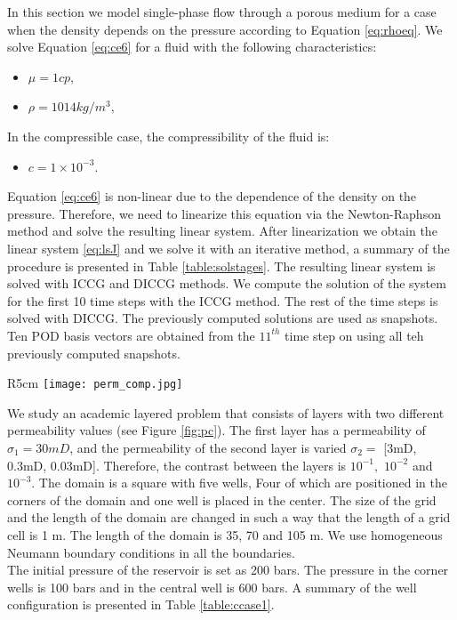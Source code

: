 \documentclass[12pt]{article}
\numberwithin{equation}{section}
\begin{document}
In this section we model single-phase flow through a porous medium for a case when the density depends on the pressure according to Equation \ref{eq:rhoeq}. We solve Equation \eqref{eq:ce6} for a fluid with the following characteristics:
\begin{itemize}
 \item $\mu = 1 cp$,
 \item $\rho = 1014 kg/m^3$,
\end{itemize}
In the compressible case, the compressibility of the fluid is:
\begin{itemize}
 \item $c= 1 \times 10^{-3}$.
\end{itemize}
Equation \eqref{eq:ce6} is non-linear due to the dependence of the density on the pressure. Therefore, we need to linearize this equation via the Newton-Raphson method and solve the resulting linear system. After linearization we obtain the linear system \eqref{eq:lsJ} and we solve it with an iterative method, a summary of the procedure is presented in Table \ref{table:solstages}. The resulting linear system is solved with ICCG and DICCG methods. We compute the solution of the system for the first 10 time steps with the ICCG method. The rest of the time steps is solved with DICCG. The previously computed solutions are used as snapshots. Ten POD basis vectors are obtained from the $11^{th}$ time step on using all teh previously computed snapshots. \\
\begin{wrapfigure}{R}{5cm}
\centering 
\vspace{-20pt}
\texttt{[image: perm\_comp.jpg]}
 \vspace{-15pt}
\caption{ Heterogeneous permeability, 5 wells, compressible problem.}\label{fig:pc}
\vspace{-10pt}
\end{wrapfigure} 

We study an academic layered problem that consists of layers with two different permeability values (see Figure \ref{fig:pc}). The first layer has a permeability of $\sigma_1 = 30mD$, and the permeability of the second layer is varied $\sigma_2 =$ [3mD, 0.3mD, 0.03mD]. Therefore, the contrast between the layers is $10^{-1},$ $10^{-2}$ and $10^{-3}$.
The domain is a square with five wells, Four of which are positioned in the corners of the domain and one well is placed in the center. The size of the grid and the length of the domain are changed in such a way that the length of a grid cell is 1 m. The length of the domain is 35, 70 and 105 m. We use homogeneous Neumann boundary conditions in all the boundaries. \\
The initial pressure of the reservoir is set as 200 bars. The pressure in the corner wells is 100 bars and in the central well is 600 bars.  A summary of the well configuration is presented in Table \ref{table:ccase1}.
\end{document}
